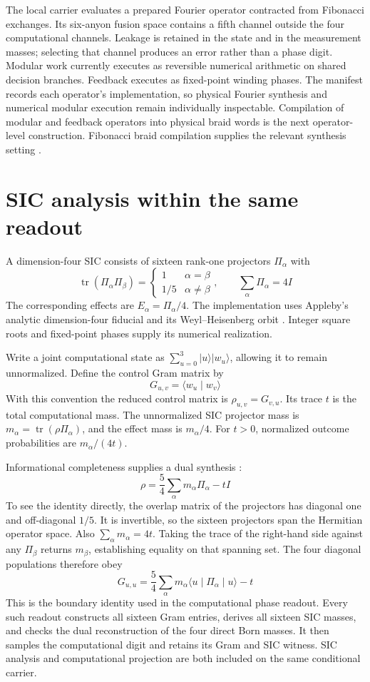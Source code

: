 \documentclass[12pt]{article}
\newcommand{\ket}[1]{\lvert #1\rangle}
\newcommand{\tr}{\operatorname{tr}}
\begin{document}
The local carrier evaluates a prepared Fourier operator contracted from Fibonacci exchanges. Its six-anyon fusion space contains a fifth channel outside the four computational channels. Leakage is retained in the state and in the measurement masses; selecting that channel produces an error rather than a phase digit. Modular work currently executes as reversible numerical arithmetic on shared decision branches. Feedback executes as fixed-point winding phases. The manifest records each operator's implementation, so physical Fourier synthesis and numerical modular execution remain individually inspectable. Compilation of modular and feedback operators into physical braid words is the next operator-level construction. Fibonacci braid compilation supplies the relevant synthesis setting \cite{kbs}.

\section*{SIC analysis within the same readout}

A dimension-four SIC consists of sixteen rank-one projectors $\Pi_\alpha$ with
\[
\tr(\Pi_\alpha\Pi_\beta)
=\begin{cases}1&\alpha=\beta\\1/5&\alpha\ne\beta\end{cases},
\qquad
\sum_\alpha\Pi_\alpha=4I
\]
The corresponding effects are $E_\alpha=\Pi_\alpha/4$. The implementation uses Appleby's analytic dimension-four fiducial and its Weyl--Heisenberg orbit \cite{appleby}. Integer square roots and fixed-point phases supply its numerical realization.

Write a joint computational state as $\sum_{u=0}^3\ket{u}\ket{w_u}$, allowing it to remain unnormalized. Define the control Gram matrix by
\[
G_{u,v}=\langle w_u\mid w_v\rangle
\]
With this convention the reduced control matrix is $\rho_{u,v}=G_{v,u}$. Its trace $t$ is the total computational mass. The unnormalized SIC projector mass is $m_\alpha=\tr(\rho\Pi_\alpha)$, and the effect mass is $m_\alpha/4$. For $t>0$, normalized outcome probabilities are $m_\alpha/(4t)$.

Informational completeness supplies a dual synthesis \cite{renes,scott}:
\[
\rho=\frac54\sum_\alpha m_\alpha\Pi_\alpha-tI
\]
To see the identity directly, the overlap matrix of the projectors has diagonal one and off-diagonal $1/5$. It is invertible, so the sixteen projectors span the Hermitian operator space. Also $\sum_\alpha m_\alpha=4t$. Taking the trace of the right-hand side against any $\Pi_\beta$ returns $m_\beta$, establishing equality on that spanning set. The four diagonal populations therefore obey
\[
G_{u,u}=\frac54\sum_\alpha m_\alpha
\langle u\mid\Pi_\alpha\mid u\rangle-t
\]
This is the boundary identity used in the computational phase readout. Every such readout constructs all sixteen Gram entries, derives all sixteen SIC masses, and checks the dual reconstruction of the four direct Born masses. It then samples the computational digit and retains its Gram and SIC witness. SIC analysis and computational projection are both included on the same conditional carrier.
\end{document}
